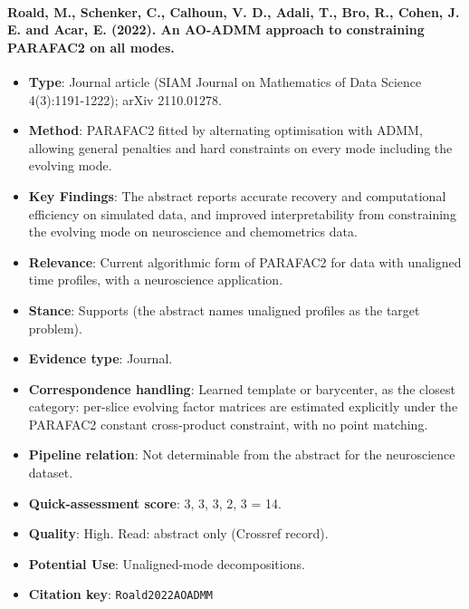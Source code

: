 \documentclass[journal,onecolumn]{IEEEtran}
\begin{document}
\paragraph{Roald, M., Schenker, C., Calhoun, V. D., Adali, T., Bro, R., Cohen, J. E. and Acar, E. (2022). An AO-ADMM approach to constraining PARAFAC2 on all modes.~\cite{Roald2022AOADMM}}\mbox{}

\begin{itemize}

\item{} \textbf{Type}: Journal article (SIAM Journal on Mathematics of Data Science 4(3):1191-1222); arXiv 2110.01278.

\item{} \textbf{Method}: PARAFAC2 fitted by alternating optimisation with ADMM, allowing general penalties and hard constraints on every mode including the evolving mode.

\item{} \textbf{Key Findings}: The abstract reports accurate recovery and computational efficiency on simulated data, and improved interpretability from constraining the evolving mode on neuroscience and chemometrics data.

\item{} \textbf{Relevance}: Current algorithmic form of PARAFAC2 for data with unaligned time profiles, with a neuroscience application.

\item{} \textbf{Stance}: Supports (the abstract names unaligned profiles as the target problem).

\item{} \textbf{Evidence type}: Journal.

\item{} \textbf{Correspondence handling}: Learned template or barycenter, as the closest category: per-slice evolving factor matrices are estimated explicitly under the PARAFAC2 constant cross-product constraint, with no point matching.

\item{} \textbf{Pipeline relation}: Not determinable from the abstract for the neuroscience dataset.

\item{} \textbf{Quick-assessment score}: 3, 3, 3, 2, 3 = 14.

\item{} \textbf{Quality}: High. Read: abstract only (Crossref record).

\item{} \textbf{Potential Use}: Unaligned-mode decompositions.

\item{} \textbf{Citation key}: \texttt{Roald2022AOADMM}

\end{itemize}
\end{document}
